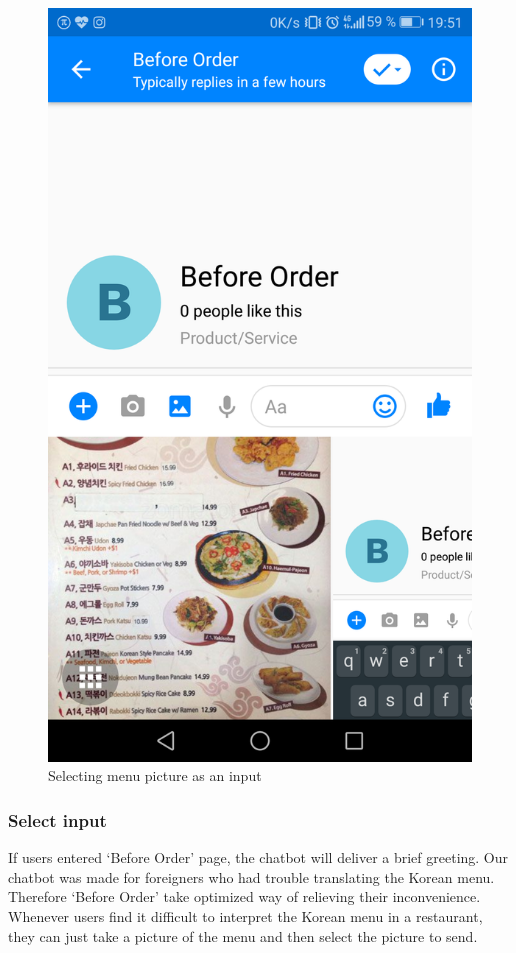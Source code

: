 \begin{figure}[htbp]
\centerline{\includegraphics[height=\custompicheight]{./pictures/Screenshot_20181125-195124}}
\caption{Selecting menu picture as an input}
\label{fig:Before Order_input_selection}
\end{figure}
\FloatBarrier
\subsubsection{Select input}
 If users entered ‘Before Order’ page, the chatbot will deliver a brief greeting. Our chatbot was made for foreigners who had trouble translating the Korean menu. Therefore ‘Before Order’ take optimized way of relieving their inconvenience. Whenever users find it difficult to interpret the Korean menu in a restaurant, they can just take a picture of the menu and then select the picture to send.



